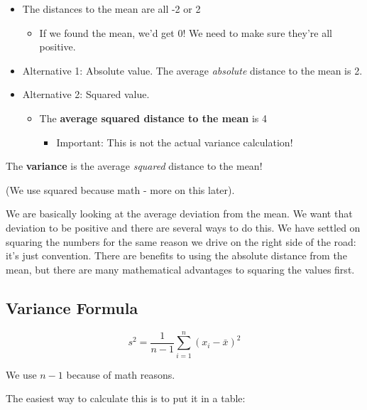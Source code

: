 \documentclass[
  letterpaper,
  DIV=11,
  numbers=noendperiod]{scrreprt}
\providecommand{\tightlist}{%
  \setlength{\itemsep}{0pt}\setlength{\parskip}{0pt}}\usepackage{longtable,booktabs,array}
\begin{document}
\begin{itemize}
\tightlist
\item
  The distances to the mean are all -2 or 2

  \begin{itemize}
  \tightlist
  \item
    If we found the mean, we'd get 0! We need to make sure they're all
    positive.
  \end{itemize}
\item
  Alternative 1: Absolute value. The average \emph{absolute} distance to
  the mean is 2.
\item
  Alternative 2: Squared value.

  \begin{itemize}
  \tightlist
  \item
    The \textbf{average squared distance to the mean} is 4

    \begin{itemize}
    \tightlist
    \item
      Important: This is not the actual variance calculation!
    \end{itemize}
  \end{itemize}
\end{itemize}

The \textbf{variance} is the average \emph{squared} distance to the
mean!

(We use squared because math - more on this later).

We are basically looking at the average deviation from the mean. We want
that deviation to be positive and there are several ways to do this. We
have settled on squaring the numbers for the same reason we drive on the
right side of the road: it's just convention. There are benefits to
using the absolute distance from the mean, but there are many
mathematical advantages to squaring the values first.

\hypertarget{variance-formula}{%
\subsection{Variance Formula}\label{variance-formula}}

\vspace{1.5cm}

\[
s^2 = \frac{1}{n-1}\sum_{i=1}^n(x_i - \bar x)^2
\]

We use \(n-1\) because of math reasons.

The easiest way to calculate this is to put it in a table:
\end{document}
